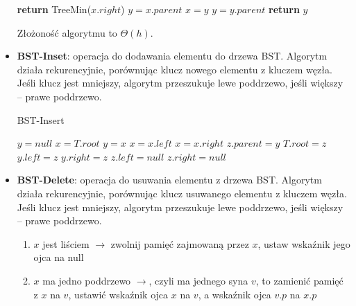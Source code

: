 \documentclass[11pt,a4paper]{article}
\begin{document}
\begin{itemize}
\begin{algorithm}
           \begin{algorithmic}[1]
               \State \textbf{return} TreeMin($x.right$)
               \Else
               \State $y = x.parent$
               \State $x = y$
               \State $y = y.parent$
               \EndWhile
               \State \textbf{return} $y$
               \EndIf
               \EndProcedure
           \end{algorithmic}
        \end{algorithm}
        Złożoność algorytmu to $\Theta(h)$.
    \item \textbf{BST-Inset}: operacja do dodawania elementu do drzewa BST. Algorytm działa rekurencyjnie, porównując klucz nowego elementu z kluczem węzła. Jeśli klucz jest mniejszy, algorytm przeszukuje lewe poddrzewo, jeśli większy -- prawe poddrzewo. \\
        \begin{algorithm}
            \caption{BST-Insert}
            \begin{algorithmic}[1]
                \State $y = null$
                \State $x = T.root$
                    \State $y = x$
                        \State $x = x.left$
                    \Else
                        \State $x = x.right$
                    \EndIf
                \EndWhile
                $z.parent = y$
                    $T.root = z$
                    $y.left = z$
                \Else
                    $y.right = z$
                \EndIf
                $z.left = null$
                $z.right = null$
                \EndProcedure
            \end{algorithmic}
        \end{algorithm}
    \item \textbf{BST-Delete}: operacja do usuwania elementu z drzewa BST. Algorytm działa rekurencyjnie, porównując klucz usuwanego elementu z kluczem węzła. Jeśli klucz jest mniejszy, algorytm przeszukuje lewe poddrzewo, jeśli większy -- prawe poddrzewo.
        \begin{enumerate}
            \item $x$ jest liściem $\rightarrow$ zwolnij pamięć zajmowaną przez $x$, ustaw wskaźnik jego ojca na null
            \item $x$ ma jedno poddrzewo $\rightarrow$, czyli ma jednego syna $v$, to zamienić pamięć z $x$ na $v$, ustawić wskaźnik ojca $x$ na $v$, a wskaźnik ojca $v.p$ na $x.p$

\end{enumerate}
\end{itemize}
\end{document}
